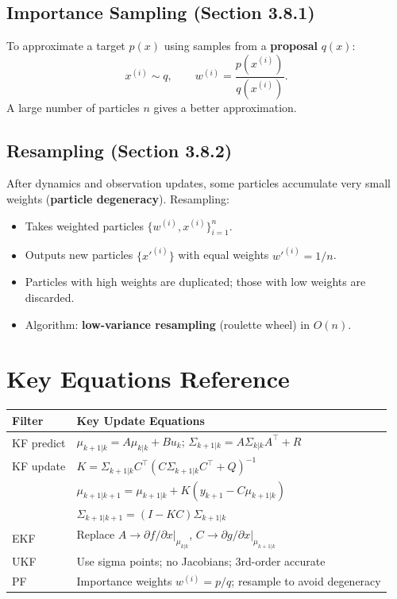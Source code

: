 \documentclass[12pt, a4paper]{article}
\begin{document}
\subsection{Importance Sampling (Section 3.8.1)}

To approximate a target $p(x)$ using samples from a \textbf{proposal}
$q(x)$:
\begin{equation}
  x^{(i)}\sim q, \qquad w^{(i)} = \frac{p(x^{(i)})}{q(x^{(i)})}.
\end{equation}
A large number of particles $n$ gives a better approximation.

\subsection{Resampling (Section 3.8.2)}

After dynamics and observation updates, some particles accumulate very
small weights (\textbf{particle degeneracy}). Resampling:
\begin{itemize}
  \item Takes weighted particles $\{w^{(i)},x^{(i)}\}_{i=1}^n$.
  \item Outputs new particles $\{x'^{(i)}\}$ with equal weights
    $w'^{(i)}=1/n$.
  \item Particles with high weights are duplicated; those with low
    weights are discarded.
  \item Algorithm: \textbf{low-variance resampling} (roulette wheel) in
    $O(n)$.
\end{itemize}

\section{Key Equations Reference}

\begin{center}
\renewcommand{\arraystretch}{1.7}
\begin{tabular}{ll}
\hline
\textbf{Filter} & \textbf{Key Update Equations} \\
\hline
KF predict & $\mu_{k+1|k}=A\mu_{k|k}+Bu_k$;\; $\Sigma_{k+1|k}=A\Sigma_{k|k}A^\top+R$ \\
KF update & $K=\Sigma_{k+1|k}C^\top(C\Sigma_{k+1|k}C^\top+Q)^{-1}$ \\
          & $\mu_{k+1|k+1}=\mu_{k+1|k}+K(y_{k+1}-C\mu_{k+1|k})$ \\
          & $\Sigma_{k+1|k+1}=(I-KC)\Sigma_{k+1|k}$ \\
EKF       & Replace $A\to\partial f/\partial x|_{\mu_{k|k}}$, $C\to\partial g/\partial x|_{\mu_{k+1|k}}$ \\
UKF       & Use sigma points; no Jacobians; 3rd-order accurate \\
PF        & Importance weights $w^{(i)}=p/q$; resample to avoid degeneracy \\
\hline
\end{tabular}
\end{center}
\end{document}
